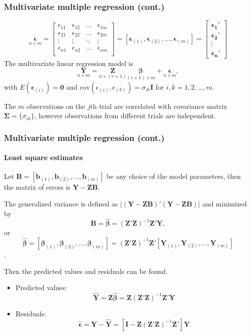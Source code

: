\documentclass{beamer}
\begin{document}
	\begin{frame}
		\frametitle{Multivariate multiple regression (cont.)}
		\[ \underset{ n \times m }{ \pmb{ \epsilon } } = \begin{bmatrix}
			\epsilon_{ 11 } & \epsilon_{ 12 } & \dots & \epsilon_{ 1m } \\
			\epsilon_{ 21 } & \epsilon_{ 22 } & \dots & \epsilon_{ 2m } \\
			\vdots   & \vdots  & \ddots & \vdots \\
			\epsilon_{ n1 } & \epsilon_{ n2} & \dots & \epsilon_{ nm } \\
		\end{bmatrix} = [ \pmb{\epsilon}_{ ( 1 ) }, \pmb{\epsilon}_{ ( 2 ) }, \dots, \pmb{\epsilon}_{ ( m ) } ] = \begin{bmatrix}
		\pmb{ \epsilon_1'} \\
		\pmb{ \epsilon_2'} \\
		\vdots \\
		\pmb{ \epsilon_n'}
	\end{bmatrix} \]
	The multivariate linear regression model is 
	\[ \underset{ n \times m }{ \pmb{ Y } } = \underset{ n \times ( r + 1 ) }{ \pmb{ Z } } \underset{ ( r + 1 ) \times m }{ \pmb{ \beta } } + \underset{ n \times m }{ \pmb{ \epsilon } }, \]
	with $E( \pmb{ \epsilon }_{ ( i ) } ) = \pmb{ 0 }$ and $\text{cov}( \epsilon_{ ( i ) }, \epsilon_{ ( k ) } ) = \sigma_{ ik } \pmb{ I }$ for $i, k = 1, 2, \dots, m$. 
	
	The $m$ observations on the $j$th trial are correlated with covariance matrix $\pmb{ \Sigma } = \{ \sigma_{ ik } \}$, however observations from different trials are independent.
	\end{frame}
	
	\begin{frame}
		\frametitle{Multivariate multiple regression (cont.)}
		\framesubtitle{Least square estimates}
		Let $\pmb{ B } = [ \pmb{ b }_{ ( 1 ) }, \pmb{ b }_{ ( 2 ) }, \dots, \pmb{ b }_{ ( m ) } ]$ be any choice of the model parameters, then the matrix of errors is $\pmb{ Y } - \pmb{ ZB }$.
		
		The generalized variance is defined as $| ( \pmb{ Y } - \pmb{ ZB } )'( \pmb{ Y } - \pmb{ ZB } ) |$ and minimized by 
		\[ \pmb{ B } = \hat{\pmb{ \beta }} = ( \pmb{ Z }'\pmb{ Z } ) ^ { -1 } \pmb{ Z }'\pmb{ Y }, \]
		or 
		\[ \hat{\pmb{ \beta }} = [ \pmb{ \beta }_{ ( 1 ) }, \pmb{ \beta }_{ ( 2 ) }, \dots, \pmb{ \beta }_{ ( m ) } ] = ( \pmb{ Z }'\pmb{ Z } ) ^ { -1 }\pmb{ Z }' [ \pmb{ Y }_{ ( 1 ) }, \pmb{ Y }_{ ( 2 ) }, \dots, \pmb{ Y }_{ ( m ) } ]\].
		
		Then the predicted values and residuals can be found.
		\begin{itemize}
			\item Predicted values: 
			\[ \hat{ \pmb{Y} } = \pmb{ Z } \hat{ \pmb{ \beta } } = \pmb{ Z } ( \pmb{Z}' \pmb{Z} ) ^ { -1 } \pmb{ Z }' \pmb{ Y } \]
			\item Residuals: \[ \hat{ \pmb{ \epsilon } } = \pmb{ Y } - \hat{ \pmb{ Y } } = [ \pmb{ I } - \pmb{ Z }( \pmb{ Z }'\pmb{ Z } ) ^ { -1 } \pmb{ Z }' ] \pmb{ Y } \]
		\end{itemize}
	\end{frame}
	
\end{document}
